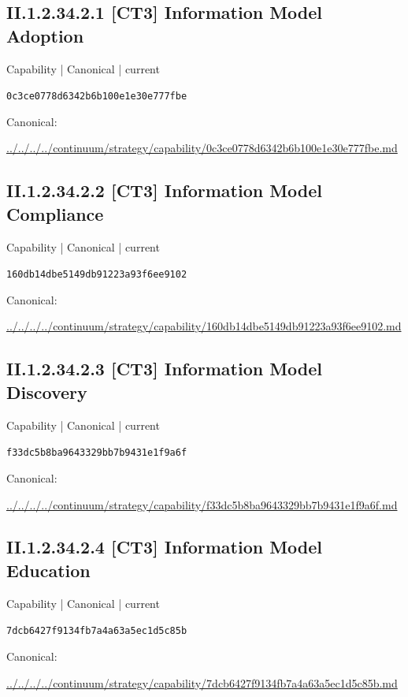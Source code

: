 \documentclass[10pt,a4paper]{article}
\begin{document}
\subsection*{II.1.2.34.2.1 [CT3] Information Model Adoption}
{\small Capability | Canonical | current}\par
\texttt{0c3ce0778d6342b6b100e1e30e777fbe}\par
Canonical: \par
{\footnotesize\url{../../../../continuum/strategy/capability/0c3ce0778d6342b6b100e1e30e777fbe.md}}\par
\subsection*{II.1.2.34.2.2 [CT3] Information Model Compliance}
{\small Capability | Canonical | current}\par
\texttt{160db14dbe5149db91223a93f6ee9102}\par
Canonical: \par
{\footnotesize\url{../../../../continuum/strategy/capability/160db14dbe5149db91223a93f6ee9102.md}}\par
\subsection*{II.1.2.34.2.3 [CT3] Information Model Discovery}
{\small Capability | Canonical | current}\par
\texttt{f33dc5b8ba9643329bb7b9431e1f9a6f}\par
Canonical: \par
{\footnotesize\url{../../../../continuum/strategy/capability/f33dc5b8ba9643329bb7b9431e1f9a6f.md}}\par
\subsection*{II.1.2.34.2.4 [CT3] Information Model Education}
{\small Capability | Canonical | current}\par
\texttt{7dcb6427f9134fb7a4a63a5ec1d5c85b}\par
Canonical: \par
{\footnotesize\url{../../../../continuum/strategy/capability/7dcb6427f9134fb7a4a63a5ec1d5c85b.md}}\par
\end{document}
